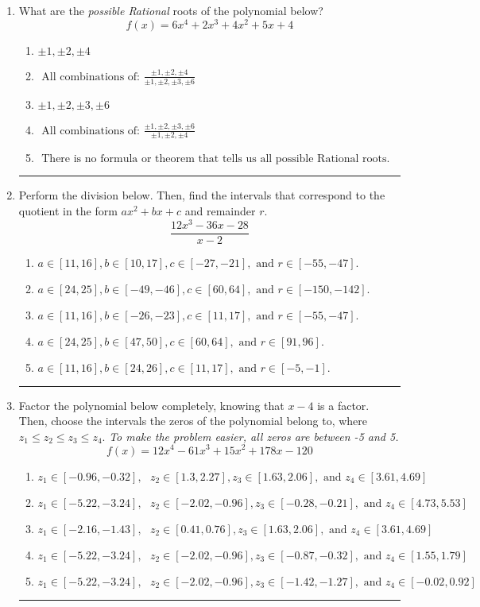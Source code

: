 \documentclass[14pt]{extbook}
\newcommand{\litem}[1]{\item#1\hspace*{-1cm}\rule{\textwidth}{0.4pt}}
\begin{document}
\begin{enumerate}
\litem{
What are the \textit{possible Rational} roots of the polynomial below?\[ f(x) = 6x^{4} +2 x^{3} +4 x^{2} +5 x + 4 \]\begin{enumerate}[label=\Alph*.]
\item \( \pm 1,\pm 2,\pm 4 \)
\item \( \text{ All combinations of: }\frac{\pm 1,\pm 2,\pm 4}{\pm 1,\pm 2,\pm 3,\pm 6} \)
\item \( \pm 1,\pm 2,\pm 3,\pm 6 \)
\item \( \text{ All combinations of: }\frac{\pm 1,\pm 2,\pm 3,\pm 6}{\pm 1,\pm 2,\pm 4} \)
\item \( \text{ There is no formula or theorem that tells us all possible Rational roots.} \)

\end{enumerate} }
\litem{
Perform the division below. Then, find the intervals that correspond to the quotient in the form $ax^2+bx+c$ and remainder $r$.\[ \frac{12x^{3} -36 x -28}{x -2} \]\begin{enumerate}[label=\Alph*.]
\item \( a \in [11, 16], b \in [10, 17], c \in [-27, -21], \text{ and } r \in [-55, -47]. \)
\item \( a \in [24, 25], b \in [-49, -46], c \in [60, 64], \text{ and } r \in [-150, -142]. \)
\item \( a \in [11, 16], b \in [-26, -23], c \in [11, 17], \text{ and } r \in [-55, -47]. \)
\item \( a \in [24, 25], b \in [47, 50], c \in [60, 64], \text{ and } r \in [91, 96]. \)
\item \( a \in [11, 16], b \in [24, 26], c \in [11, 17], \text{ and } r \in [-5, -1]. \)

\end{enumerate} }
\litem{
Factor the polynomial below completely, knowing that $x -4$ is a factor. Then, choose the intervals the zeros of the polynomial belong to, where $z_1 \leq z_2 \leq z_3 \leq z_4$. \textit{To make the problem easier, all zeros are between -5 and 5.}\[ f(x) = 12x^{4} -61 x^{3} +15 x^{2} +178 x -120 \]\begin{enumerate}[label=\Alph*.]
\item \( z_1 \in [-0.96, -0.32], \text{   }  z_2 \in [1.3, 2.27], z_3 \in [1.63, 2.06], \text{   and   } z_4 \in [3.61, 4.69] \)
\item \( z_1 \in [-5.22, -3.24], \text{   }  z_2 \in [-2.02, -0.96], z_3 \in [-0.28, -0.21], \text{   and   } z_4 \in [4.73, 5.53] \)
\item \( z_1 \in [-2.16, -1.43], \text{   }  z_2 \in [0.41, 0.76], z_3 \in [1.63, 2.06], \text{   and   } z_4 \in [3.61, 4.69] \)
\item \( z_1 \in [-5.22, -3.24], \text{   }  z_2 \in [-2.02, -0.96], z_3 \in [-0.87, -0.32], \text{   and   } z_4 \in [1.55, 1.79] \)
\item \( z_1 \in [-5.22, -3.24], \text{   }  z_2 \in [-2.02, -0.96], z_3 \in [-1.42, -1.27], \text{   and   } z_4 \in [-0.02, 0.92] \)


\end{enumerate}}
\end{enumerate}
\end{document}
